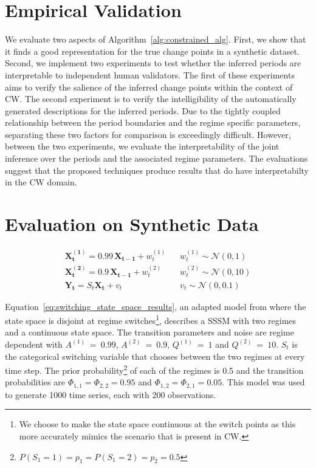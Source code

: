 \section{Empirical Validation}\label{sec:user_evaluation}
We evaluate two aspects of Algorithm~\ref{alg:constrained_alg}. First, we show that it finds a good representation for the true change points in a synthetic dataset. Second, we implement two experiments to test whether the inferred periods are interpretable to independent human validators. The first of these experiments aims to verify the salience of the inferred change points within the context of CW. The second experiment is to verify the intelligibility of the automatically generated descriptions for the inferred periods. Due to the tightly coupled relationship between the period boundaries and the regime specific parameters, separating these two factors for comparison is exceedingly difficult. However, between the two experiments, we evaluate the interpretability of the joint inference over the periods and the associated regime parameters. The evaluations suggest that the proposed techniques produce results that do have interpretabilty in the CW domain.

\section{Evaluation on Synthetic Data}

\begin{equation}
  \begin{split}
      \mathbf{X^{(1)}_t} = 0.99 \,\mathbf{X_{t-1}} + w^{(1)}_t \hspace{10pt} & w^{(1)}_t \sim \mathcal{N}(0,1) \\
      \mathbf{X^{(2)}_t} = 0.9 \,\mathbf{X_{t-1}} + w^{(2)}_t \hspace{10pt} & w^{(2)}_t \sim \mathcal{N}(0,10) \\
      \mathbf{Y_t} = S_t\mathbf{X_t} + v_t \hspace{10pt} & v_t \sim \mathcal{N}(0,0.1)
  \end{split}\label{eq:switching_state_space_results}
\end{equation}

Equation~\ref{eq:switching_state_space_results}, an adapted model from \citet{ghahramani2000variational} where the state space is disjoint at regime switches\footnote{We choose to make the state space continuous at the switch points as this more accurately mimics the scenario that is present in CW.}, describes a SSSM with two regimes and a continuous state space. The transition parameters and noise are regime dependent with $A^{(1)}~=~0.99$, $A^{(2)}~=~0.9$, $Q^{(1)}~=~1$ and $Q^{(2)}~=~10$. $S_t$ is the categorical switching variable that chooses between the two regimes at every time step. The prior probability\footnote{$P(S_1=1)=p_1=P(S_1=2)=p_2=0.5$} of each of the regimes is 0.5 and the transition probabilities are $\Phi_{1,1} = \Phi_{2,2} = 0.95$ and $\Phi_{1,2} = \Phi_{2,1} = 0.05$. This model was used to generate 1000 time series, each with 200 observations.

